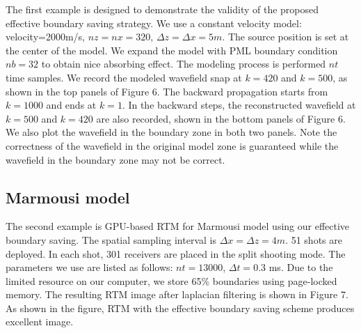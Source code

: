 The first example is designed to demonstrate the validity of the proposed effective boundary saving strategy. We use a constant velocity model: velocity=2000m/s, $nz=nx=320$, $\Delta z=\Delta x=5m$. The source position is set at the center of the model. We expand the model with PML boundary condition $nb=32$ to obtain nice absorbing effect. The modeling process is performed $nt$ time samples. We record the modeled wavefield snap at $k=420$ and $k=500$, as shown in the top panels of Figure 6. The backward propagation starts from $k=1000$ and ends at $k=1$. In the backward steps, the reconstructed wavefield at $k=500$ and $k=420$ are also recorded, shown in the bottom panels of Figure 6. We also plot the wavefield in the boundary zone in both two panels. Note the correctness of the wavefield in the original model zone is guaranteed while the wavefield in the boundary zone may not be correct.


\subsection{Marmousi model}

The second example is GPU-based RTM for Marmousi model using our effective boundary saving. The spatial sampling interval is $\Delta x=\Delta z=4m$. 51 shots are deployed. In each shot, 301 receivers are placed in the split shooting mode. The parameters we use are listed as follows: $nt=13000$, $\Delta t=0.3$ ms. Due to the limited resource on our computer, we store 65\% boundaries using page-locked memory. The resulting RTM image after laplacian filtering is shown in Figure 7. As shown in the figure, RTM with the effective boundary saving scheme produces excellent image.


